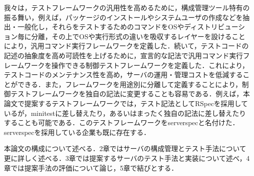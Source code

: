 我々は，テストフレームワークの汎用性を高めるために，構成管理ツール特有の振る舞い，例えば，パッケージのインストールやシステムユーザの作成などを抽出・一般化し，それらをテストするためのコマンドをOSやディストリビューション毎に分離，その上でOSや実行形式の違いを吸収するレイヤーを設けることにより，汎用コマンド実行フレームワークを定義した．続いて，テストコードの記述の抽象度を高め可読性を上げるために，宣言的な記法で汎用コマンド実行フレームワークを操作できる制御テストフレームワークを定義した．これにより，テストコードのメンテナンス性を高め，サーバの運用・管理コストを低減することができる．また，フレームワークを用途別に分離して定義することにより，制御テストフレームワークを独自の記法に変更することも容易である．例えば，本論文で提案するテストフレームワークでは，テスト記法としてRSpec\cite{rspec}を採用しているが，minitest\cite{minitest}に差し替えたり，あるいはまったく独自の記法に差し替えたりすることも可能である．このテストフレームワークをserverspec\cite{serverspec}と名付けた．serverspecを採用している企業も既に存在する\cite{nintendo}\cite{wantedly}．

本論文の構成について述べる．2章ではサーバの構成管理とテスト手法について更に詳しく述べる．3章では提案するサーバのテスト手法と実装について述べ，4章では提案手法の評価について論じ，5章で結びとする．
